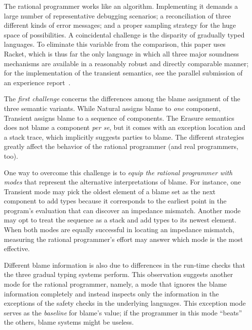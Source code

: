 
The rational programmer works like an algorithm. Implementing it demands a large
number of representative debugging scenarios; a reconciliation of three
different kinds of error messages; and a proper sampling strategy for the huge
space of possibilities. A coincidental challenge is the disparity of gradually
typed languages. To eliminate this variable from the comparison, this paper uses
Racket, which is thus far the only language in which all three major soundness
mechanisms are available in a reasonably robust and directly comparable manner;
for the implementation of the transient semantics, see the parallel submission
of an experience report~\cite{ttt21}.

The {\em first challenge\/} concerns the differences among the blame assignment
of the three semantic variants.  While Natural assigns blame to {\em one\/}
component, Transient assigns blame to a sequence of components. The Erasure
semantics does not blame a component {\it per se\/}, but it comes with an
exception location and a stack trace, which implicitly suggests parties to
blame.  The different strategies greatly affect the behavior of the rational
programmer (and real programmers, too).

One way to overcome this challenge is to {\em equip the rational programmer with
modes \/} that represent the alternative interpretations of blame.  For
instance, one Transient mode may pick the oldest element of a blame set as
the next component to add types because it corresponds to the earliest point in
the program's evaluation that can discover an impedance mismatch.  Another mode
may opt to treat the sequence as a stack and add types to its newest element.
When both modes are equally successful in locating an impedance mismatch,
measuring the rational programmer's effort may answer which mode is the most
effective.

Different blame information is also due to differences in the run-time checks
that the three gradual typing systems perform. This observation suggests another
mode for the rational programmer, namely, a mode that ignores the blame
information completely and instead inspects only the information in the
exceptions of the safety checks in the underlying languages.  This exception
mode serves as the {\em baseline\/} for blame's value; if the programmer in this
mode ``beats'' the others, blame systems might be useless.


